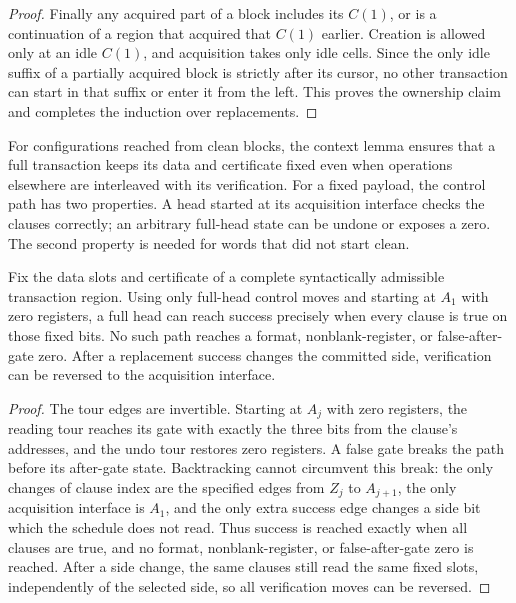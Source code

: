 \begin{proof}
Finally any acquired part of a block includes its $C(1)$, or is a
continuation of a region that acquired that $C(1)$ earlier.  Creation
is allowed only at an idle $C(1)$, and acquisition takes only idle
cells.  Since the only idle suffix of a partially acquired block is
strictly after its cursor, no other transaction can start in that
suffix or enter it from the left.  This proves the ownership claim
and completes the induction over replacements.
\end{proof}

For configurations reached from clean blocks, the context lemma ensures
that a full transaction keeps its data and certificate fixed even when
operations elsewhere are interleaved with its verification. For a fixed
payload, the control path has two
properties. A head started at its acquisition interface checks the
clauses correctly; an arbitrary full-head state can be undone or exposes
a zero. The second property is needed for words that did not start clean.

\begin{lemma}\label{fr:verification}
Fix the data slots and certificate of a complete syntactically admissible
transaction region.
Using only full-head control moves and starting at $A_1$ with zero
registers, a full head can reach success
precisely when every clause is true on those fixed bits. No such path
reaches a format, nonblank-register, or false-after-gate zero. After a
replacement success changes the committed side, verification can be
reversed to the acquisition interface.
\end{lemma}

\begin{proof}
The tour edges are invertible. Starting at $A_j$ with zero registers,
the reading tour reaches its gate with exactly the three bits from
the clause's addresses, and the undo tour restores zero registers.
A false gate breaks the path before its after-gate state.
Backtracking cannot circumvent this break: the only changes of clause
index are the specified edges from $Z_j$ to $A_{j+1}$, the only
acquisition interface is $A_1$, and the only extra success edge changes
a side bit which the schedule does not read. Thus success is reached
exactly when all clauses are true, and no format, nonblank-register,
or false-after-gate zero is reached. After a side change, the same
clauses still read the same fixed slots, independently of the selected
side, so all verification moves can be reversed.
\end{proof}

